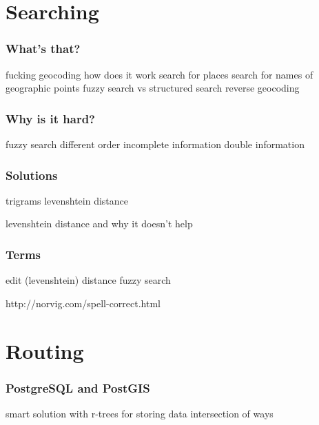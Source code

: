 \documentclass{beamer}
\begin{document}
\begin{frame}

\end{frame}

\section{Searching}

\begin{frame}
  \frametitle{What's that?}
  fucking geocoding how does it work
  search for places
  search for names of geographic points
  fuzzy search vs structured search
  reverse geocoding
\end{frame}

\begin{frame}
  \frametitle{Why is it hard?}
  fuzzy search
  different order
  incomplete information
  double information
\end{frame}

\begin{frame}
  \frametitle{Solutions}
  trigrams
  levenshtein distance
\end{frame}

\begin{frame}
  levenshtein distance and why it doesn't help
\end{frame}

\begin{frame}
  \frametitle{Terms}
  edit (levenshtein) distance
  fuzzy search
\end{frame}



http://norvig.com/spell-correct.html







\section{Routing}

\begin{frame}
  \frametitle{PostgreSQL and PostGIS}

\end{frame}

\begin{frame}
  smart solution with r-trees for storing data
  intersection of ways
\end{frame}
\end{document}
